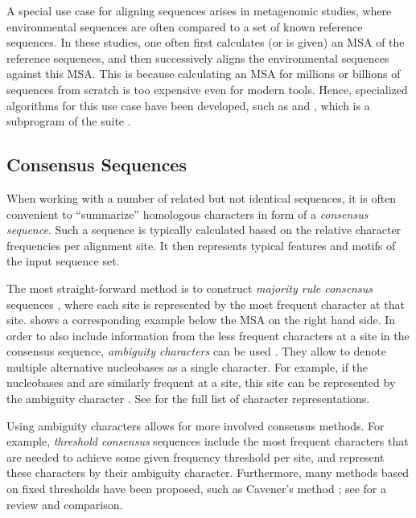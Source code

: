 A special use case for aligning sequences arises in metagenomic studies,
where environmental sequences are often compared to a set of known reference sequences.
In these studies, one often first calculates (or is given) an MSA of the reference sequences,
and then successively aligns the environmental sequences against this MSA.
This is because calculating an MSA for millions or billions of sequences from scratch is too expensive even for modern tools.
Hence, specialized algorithms for this use case have been developed,
such as  \citep{Berger2011a,Berger2012} and
, which is a subprogram of the  suite \citep{Eddy1998,Eddy2009}.


\subsection{Consensus Sequences}
\label{ch:Foundations:sec:SequenceAnalysis:sub:ConsensusSequences}

When working with a number of related but not identical sequences,
it is often convenient to ``summarize'' homologous characters in form of a \emph{consensus sequence}.
Such a sequence is typically calculated based on the relative character frequencies per alignment site.
It then represents typical features and motifs of the input sequence set.

The most straight-forward method is to construct \emph{majority rule consensus} sequences \citep{May1952,Day1992a},
where each site is represented by the most frequent character at that site.
 shows a corresponding example below the MSA on the right hand side.
In order to also include information from the less frequent characters at a site in the consensus sequence,
\emph{ambiguity characters} can be used \cite{IUPAC1970}.
They allow to denote multiple alternative nucleobases as a single character.
For example, if the nucleobases  and  are similarly frequent at a site,
this site can be represented by the ambiguity character .
See  for the full list of character representations.

Using ambiguity characters allows for more involved consensus methods.
For example, \emph{threshold consensus} sequences \citep{Day1992a,Day1992} include the most frequent characters
that are needed to achieve some given frequency threshold per site,
and represent these characters by their ambiguity character.
Furthermore, many methods based on fixed thresholds have been proposed,
such as Cavener's method \citep{Cavener1987,Cavener1991a};
see \cite{Day1992a} for a review and comparison.

